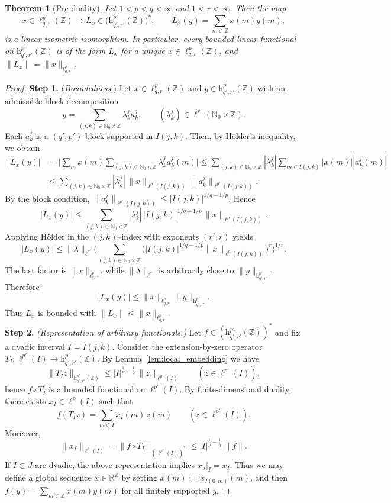 \documentclass[preprint,12pt]{elsarticle}
\newtheorem{theorem}{Theorem}[section]
\begin{document}
\begin{theorem}[Pre-duality] \label{the:preduality}
Let $1<p< q<\infty$ and $1<r<\infty$. Then the map \[ x\in \ell_{q,r}^p(\mathbb{Z})\longmapsto L_x\in \big(\mathrm{h}_{q',r'}^{p'}(\mathbb{Z})\big)^*, \qquad L_x(y)=\sum_{m\in\mathbb{ Z}} x(m)y(m), \] is a linear isometric isomorphism. In particular, every bounded linear functional on $\mathrm{h}_{q',r'}^{p'}(\mathbb{Z})$ is of the form $L_x$ for a unique $x\in\ell_{q,r}^p(\mathbb{Z})$, and $\|L_x\|=\|x\|_{\ell_{q,r}^p}$. 
\end{theorem} 
\begin{proof} 
\textbf{Step 1.} (\emph{Boundedness.}) Let $x\in\ell_{q,r}^p(\mathbb{Z})$ and $y\in \mathrm{h}_{q',r'}^{p'}(\mathbb{Z})$ with an admissible block decomposition
\[ y=\sum_{(j,k)\in \mathbb{N}_{0}\times\mathbb{Z}}\lambda_k^j a_k^j, \qquad (\lambda_k^j)\in \ell^{r'}(\mathbb N_0\times\mathbb{Z}). \] 
Each $a_k^j$ is a $(q',p')$-block supported in $I(j,k)$. Then, by Hölder’s inequality, we obtain
\[ \begin{aligned}
|L_x(y)| &= \Big|\sum_{m} x(m)\sum_{(j,k)\in \mathbb{N}_{0}\times\mathbb{Z}}\lambda_k^j a_k^j(m)\Big| \le \sum_{(j,k)\in \mathbb{N}_{0}\times\mathbb{Z}} |\lambda_k^j|\sum_{m\in I(j,k)} |x(m)||a_k^j(m)| \\ &\le \sum_{(j,k)\in \mathbb{N}_{0}\times\mathbb{Z}} |\lambda_k^j|\, \|x\|_{\ell^p(I(j,k))}\,\|a_k^j\|_{\ell^{p'}(I(j,k))}. 
\end{aligned} \]
By the block condition, $\|a_k^j\|_{\ell^{p'}(I(j,k))}\le |I(j,k)|^{1/q-1/p}$. Hence \[ |L_x(y)| \le \sum_{(j,k)\in \mathbb{N}_{0}\times\mathbb{Z}} |\lambda_k^j|\,|I(j,k)|^{1/q-1/p}\,\|x\|_{\ell^p(I(j,k))}. \] Applying Hölder in the $(j,k)$–index with exponents $(r',r)$ yields \[ |L_x(y)| \le \|\lambda\|_{\ell^{r'}} \Big(\sum_{(j,k)\in \mathbb{N}_{0}\times\mathbb{Z}} \big(|I(j,k)|^{1/q-1/p}\|x\|_{\ell^p(I(j,k))}\big)^r\Big)^{1/r}. \] The last factor is $\|x\|_{\ell_{q,r}^p}$, while $\|\lambda\|_{\ell^{r'}}$ is arbitrarily close to $\|y\|_{\mathrm{h}_{q',r'}^{p'}}$. Therefore \[ |L_x(y)| \le \|x\|_{\ell_{q,r}^p}\,\|y\|_{\mathrm{h}_{q',r'}^{p'}}. \] Thus $L_x$ is bounded with $\|L_x\|\le \|x\|_{\ell_{q,r}^p}$.\\ 
\textbf{Step 2.} \emph{(Representation of arbitrary functionals.)}
Let $f\in(\mathrm{h}^{p'}_{q',r'}(\mathbb Z))^*$ and fix a dyadic interval $I=I(j,k)$.
Consider the extension-by-zero operator $T_I:\ell^{p'}(I)\to \mathrm{h}^{p'}_{q',r'}(\mathbb Z)$.
By Lemma~\ref{lem:local_embedding} we have
\[
\|T_I z\|_{\mathrm{h}^{p'}_{q',r'}(\mathbb Z)}\le |I|^{\frac1p-\frac1q}\,\|z\|_{\ell^{p'}(I)}
\qquad (z\in \ell^{p'}(I)),
\]
hence $f\circ T_I$ is a bounded functional on $\ell^{p'}(I)$.
By finite-dimensional duality, there exists $x_I\in \ell^p(I)$ such that
\[
f(T_I z)=\sum_{m\in I} x_I(m)\,z(m)\qquad (z\in \ell^{p'}(I)).
\]
Moreover,
\[
\|x_I\|_{\ell^p(I)}=\|f\circ T_I\|_{(\ell^{p'}(I))^*}\le |I|^{\frac1p-\frac1q}\,\|f\|.
\]
If $I\subset J$ are dyadic, the above representation implies $x_J|_I=x_I$.
Thus we may define a global sequence $x\in \mathbb R^{\mathbb Z}$ by setting
$x(m):=x_{I(0,m)}(m)$, and then $f(y)=\sum_{m\in\mathbb Z}x(m)y(m)$ for all finitely supported $y$.



\end{proof}
\end{document}
